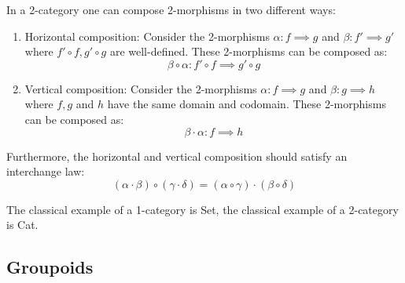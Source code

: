 	\begin{example}[2-Category]
		In a 2-category one can compose 2-morphisms in two different ways:
		\begin{enumerate}
			\item Horizontal composition:
			Consider the 2-morphisms $\alpha:f\implies g$ and $\beta:f'\implies g'$ where $f'\circ f, g'\circ g$ are well-defined. These 2-morphisms can be composed as: \[\beta\circ\alpha: f'\circ f\implies g'\circ g\]
			\item Vertical composition:
			Consider the 2-morphisms $\alpha:f\implies g$ and $\beta:g\implies h$ where $f, g$ and $h$ have the same domain and codomain. These 2-morphisms can be composed as: \[\beta\cdot\alpha: f\implies h\]
		\end{enumerate}
		Furthermore, the horizontal and vertical composition should satisfy an interchange law:
		\begin{equation}
			(\alpha\cdot\beta)\circ(\gamma\cdot\delta) = (\alpha\circ\gamma)\cdot(\beta\circ\delta)
		\end{equation}
	\end{example}
	
	
	\begin{example}
		The classical example of a 1-category is Set, the classical example of a 2-category is Cat.
	\end{example}

\subsection{Groupoids}

	
